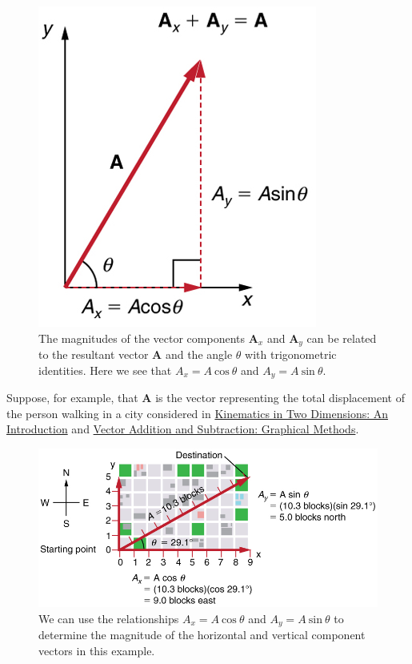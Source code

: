 \documentclass[
]{book}
\begin{document}
\begin{figure}
\hypertarget{import-auto-id1165298704788}{%
\centering
\includegraphics{images/Figure_03_03_02a.jpg}
\caption{The magnitudes of the vector components \(\mathbf{A}_{x}{}\) and
\(\mathbf{A}_{y}{}\) can be related to the resultant vector \(\mathbf{A}{}\)
and the angle \(\theta{}\) with trigonometric identities. Here we see that
\({{A_{x} = A}\ \text{cos}\ \theta}{}\) and
\({{A_{y} = A}\ \text{sin}\ \theta}{}\).}\label{import-auto-id1165298704788}
}
\end{figure}

Suppose, for example, that \(\mathbf{A}{}\) is the vector representing the
total displacement of the person walking in a city considered in
\href{/m54779}{Kinematics in Two Dimensions: An Introduction} and \href{/m54781}{Vector
Addition and Subtraction: Graphical Methods}.

\begin{figure}
\hypertarget{import-auto-id1165298544262}{%
\centering
\includegraphics{images/Figure_03_03_03.jpg}
\caption{We can use the relationships \({{A_{x} = A}\ \text{cos}\ \theta}{}\) and
\({{A_{y} = A\ }\text{sin}\ \theta}{}\) to determine the magnitude of the
horizontal and vertical component vectors in this
example.}\label{import-auto-id1165298544262}
}
\end{figure}
\end{document}
